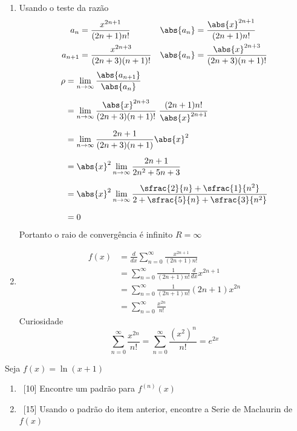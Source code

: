 \documentclass[a4paper,12pt,fleqn]{article}
\begin{document}
\begin{answer}
\begin{enumerate}[label=\alph*)]
\item
  Usando o teste da razão
  \begin{align*}
    a_n & = \frac{x^{2n+1}}{(2n+1)n!} &
    \abs{a_n} & = \frac{\abs{x}^{2n+1}}{(2n+1)n!} \\
    a_{n+1} & = \frac{x^{2n+3}}{(2n+3)(n+1)!} &
    \abs{a_n} & = \frac{\abs{x}^{2n+3}}{(2n+3)(n+1)!}
  \end{align*}
  \begin{align*}
    \rho
    & = \lim_{n\to\infty} \frac{\abs{a_{n+1}}}{\abs{a_n}} \\[2mm]
    & = \lim_{n\to\infty} \frac{\abs{x}^{2n+3}}{(2n+3)(n+1)!}\;
                          \frac{(2n+1)n!}{\abs{x}^{2n+1}}\\[2mm]
    & = \lim_{n\to\infty} \frac{2n+1}{(2n+3)(n+1)} \abs{x}^2 \\[2mm]
    & =  \abs{x}^2 \lim_{n\to\infty} \frac{2n+1}{2n^2+5n+3} \\[2mm]
    & =  \abs{x}^2 \lim_{n\to\infty} \frac{\sfrac{2}{n}+\sfrac{1}{n^2}}{2+\sfrac{5}{n}+\sfrac{3}{n^2}} \\[2mm]
    & = 0
  \end{align*}
  Portanto o raio de convergência é infinito \(R=\infty\)

\item
  \begin{align*}
    f(x)
    & = \frac{d}{dx} \sum_{n=0}^\infty \frac{x^{2n+1}}{(2n+1)n!} \\[2mm]
    & = \sum_{n=0}^\infty \frac{1}{(2n+1)n!} \frac{d}{dx} x^{2n+1} \\[2mm]
    & = \sum_{n=0}^\infty \frac{1}{(2n+1)n!} (2n+1)x^{2n} \\[2mm]
    & = \sum_{n=0}^\infty \frac{x^{2n}}{n!}
  \end{align*}
  Curiosidade
  \[
    \sum_{n=0}^\infty \frac{x^{2n}}{n!}
    = \sum_{n=0}^\infty \frac{\left(x^2\right)^n}{n!}
    = e^{2x}
  \]
\end{enumerate}
\end{answer}

Seja \( f(x) = \ln(x+1)\)
\begin{enumerate}[label=\alph*)]
  \item\ [10] Encontre um padrão para \(f^{(n)}(x)\)
  \item\ [15] Usando o padrão do item anterior, encontre a
              Serie de Maclaurin de $f(x)$
\end{enumerate}
\end{document}
